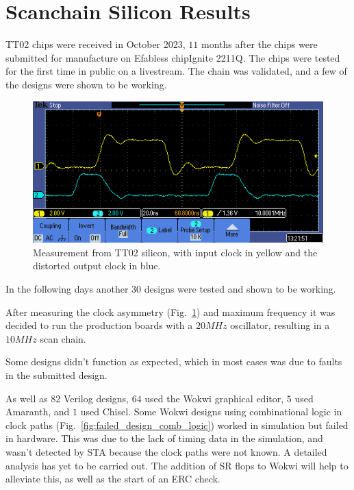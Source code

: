 \section{Scanchain Silicon Results}
\label{sec:scan_chain_res}

TT02 chips were received in October 2023, \(11\) months after the chips were submitted for manufacture on Efabless chipIgnite 2211Q.
The chips were tested for the first time in public on a livestream\cite{siliconalive}.
The chain was validated, and a few of the designs were shown to be working.

\begin{figure}[htp]
\centering
\includegraphics[width=\columnwidth]{./Figs/tt02_clock_out.png}
\caption{Measurement from TT02 silicon, with input clock in yellow and the distorted output clock in blue.}
\label{fig:TT02_clock_out}
\end{figure}

In the following days another \(30\) designs were tested and shown to be working.

After measuring the clock asymmetry (Fig.~\ref{fig:TT02_clock_out}) and maximum frequency it was decided to run the production boards with a \(20MHz\) oscillator, resulting in a \(10MHz\) scan chain.

Some designs didn’t function as expected, which in most cases was due to faults in the submitted design.

As well as \(82\) Verilog designs, \(64\) used the Wokwi graphical editor, \(5\) used Amaranth, and \(1\) used Chisel.
Some Wokwi designs using combinational logic in clock paths (Fig.~\ref{fig:failed_design_comb_logic}) worked in simulation but failed in hardware.
This was due to the lack of timing data in the simulation, and wasn’t detected by STA because the clock paths were not known.
A detailed analysis has yet to be carried out.
The addition of SR flops to Wokwi will help to alleviate this, as well as the start of an ERC check.

